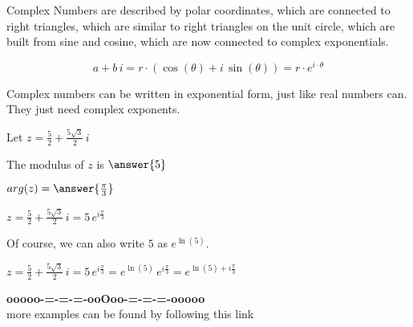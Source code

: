\documentclass{ximera}
\begin{document}
Complex Numbers are described by polar coordinates, which are connected to right triangles, which are similar to right triangles on the unit circle, which are built from sine and cosine, which are now connected to complex exponentials.




\begin{center}


\[
a + b \, i =  r \cdot (\cos(\theta) + i \, \sin(\theta)) = r \cdot e^{i \cdot \theta}
\]

\end{center}


Complex numbers can be written in exponential form, just like real numbers can.  They just need complex exponents.



\begin{example}


Let $z = \frac{5}{2} + \frac{5\sqrt{3}}{2} \, i$

The modulus of $z$ is $\answer{5}$ 

$arg(z) = \answer{\frac{\pi}{3}}$


$z = \frac{5}{2} + \frac{5\sqrt{3}}{2} \, i = 5 \, e^{i \tfrac{\pi}{3}}$

\end{example}




Of course, we can also write $5$ as $e^{\ln(5)}$.


$z = \frac{5}{2} + \frac{5\sqrt{3}}{2} \, i = 5 \, e^{i \tfrac{\pi}{3}} = e^{\ln(5)} \, e^{i \tfrac{\pi}{3}} = e^{\ln(5) + i \tfrac{\pi}{3}}$












\begin{center}
\textbf{\textcolor{green!50!black}{ooooo-=-=-=-ooOoo-=-=-=-ooooo}} \\

more examples can be found by following this link\\ 

\end{center}
\end{document}
